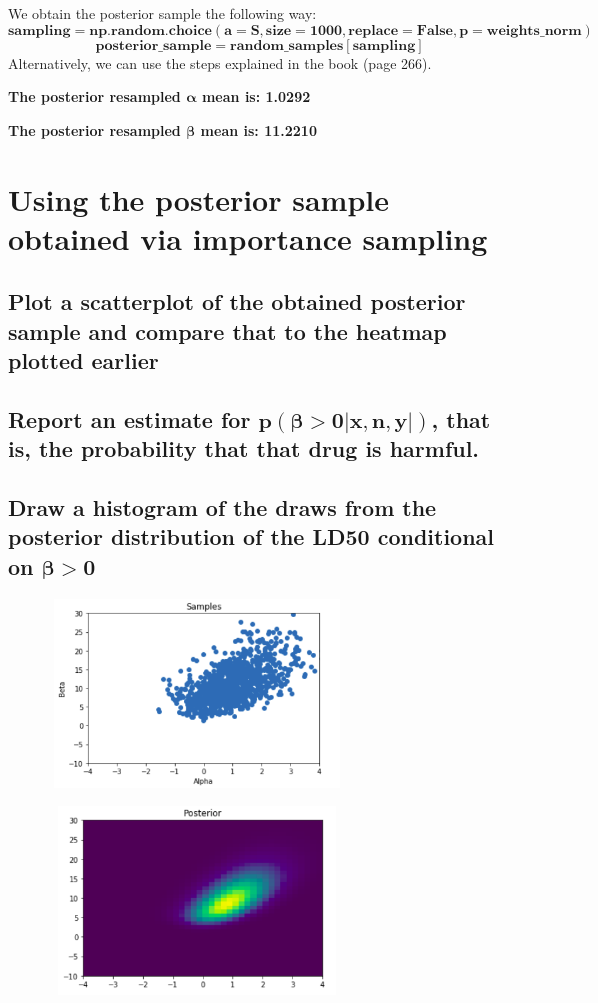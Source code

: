 \documentclass[17pt]{article}
\begin{document}
We obtain the posterior sample the following way:
$$ \mathbf{sampling = np.random.choice(a=S, size=1000, replace=False, p=weights\_norm)} $$
$$ \mathbf{posterior\_sample = random\_samples[sampling]} $$
Alternatively, we can use the steps explained in the book (page 266).

\textbf{The posterior resampled $\mathbf{\alpha}$ mean is: 1.0292}

\textbf{The posterior resampled $\mathbf{\beta}$ mean is: 11.2210}


\section{Using the posterior sample obtained via importance sampling}
\subsection{Plot a scatterplot of the obtained posterior sample and compare that to the heatmap plotted earlier}
\subsection{Report an estimate for $\mathbf{p(\beta>0|x,n,y|)}$, that is, the probability that that drug is harmful.}
\subsection{Draw a histogram of the draws from the posterior distribution of the LD50 conditional on $\mathbf{\beta>0}$}

\begin{center}
\includegraphics[width=10cm, height=5cm]{scatter_posterior_samples.png}
\end{center}

\begin{center}
\includegraphics[width=10cm, height=5cm]{posterior.png}
\end{center}
\end{document}
